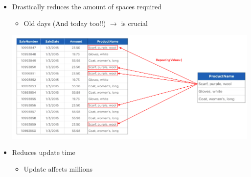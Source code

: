 \documentclass[12pt]{article}
\begin{document}
\begin{itemize}
    \item Drastically reduces the amount of spaces required
    \begin{itemize}
        \item Old days (And today too!!) $\to$ is crucial
    \end{itemize}

    \begin{center}
    \includegraphics[width=0.8\linewidth]{images/part_1_notes_1.png}
    \end{center}
    \item Reduces update time
    \begin{itemize}
        \item Update affects millions
    \end{itemize}
\end{itemize}
\end{document}
